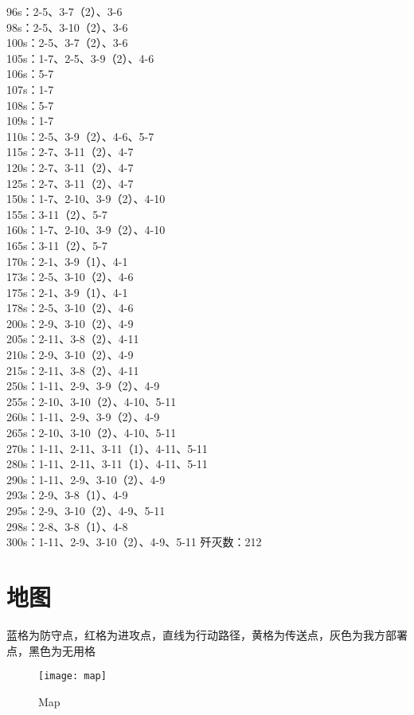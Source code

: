 \documentclass[a4paper,12pt]{article}
\begin{document}
		\indent 96s：2-5、3-7（2）、3-6\\
		\indent 98s：2-5、3-10（2）、3-6\\
		\indent 100s：2-5、3-7（2）、3-6\\
		\indent 105s：1-7、2-5、3-9（2）、4-6\\
		\indent 106s：5-7\\
		\indent 107s：1-7\\
		\indent 108s：5-7\\
		\indent 109s：1-7\\
		\indent 110s：2-5、3-9（2）、4-6、5-7\\
		\indent 115s：2-7、3-11（2）、4-7\\
		\indent 120s：2-7、3-11（2）、4-7\\
		\indent 125s：2-7、3-11（2）、4-7\\
		\indent 150s：1-7、2-10、3-9（2）、4-10\\
		\indent 155s：3-11（2）、5-7\\
		\indent 160s：1-7、2-10、3-9（2）、4-10\\
		\indent 165s：3-11（2）、5-7\\
		\indent 170s：2-1、3-9（1）、4-1\\
		\indent 173s：2-5、3-10（2）、4-6\\
		\indent 175s：2-1、3-9（1）、4-1\\
		\indent 178s：2-5、3-10（2）、4-6\\
		\indent 200s：2-9、3-10（2）、4-9\\
		\indent 205s：2-11、3-8（2）、4-11\\
		\indent 210s：2-9、3-10（2）、4-9\\
		\indent 215s：2-11、3-8（2）、4-11\\
		\indent 250s：1-11、2-9、3-9（2）、4-9\\
		\indent 255s：2-10、3-10（2）、4-10、5-11\\
		\indent 260s：1-11、2-9、3-9（2）、4-9\\
		\indent 265s：2-10、3-10（2）、4-10、5-11\\
		\indent 270s：1-11、2-11、3-11（1）、4-11、5-11\\
		\indent 280s：1-11、2-11、3-11（1）、4-11、5-11\\
		\indent 290s：1-11、2-9、3-10（2）、4-9\\
		\indent 293s：2-9、3-8（1）、4-9\\
		\indent 295s：2-9、3-10（2）、4-9、5-11\\
		\indent 298s：2-8、3-8（1）、4-8\\
		\indent 300s：1-11、2-9、3-10（2）、4-9、5-11
		\indent 歼灭数：212
	\section{地图}
		蓝格为防守点，红格为进攻点，直线为行动路径，黄格为传送点，灰色为我方部署点，黑色为无用格
		\begin{figure}[p]
			\centering
			\texttt{[image: map]}
			\caption{Map}
		\end{figure}
\end{document}
